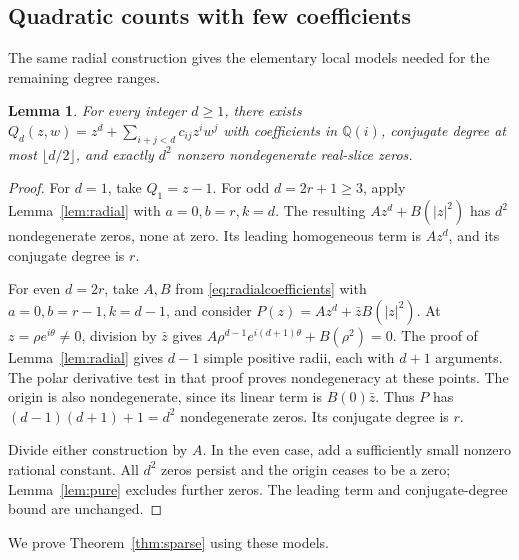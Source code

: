 \documentclass[a4paper]{amsart}
\newtheorem{lem}[thm]{Lemma}
\theoremstyle{remark}
\newcommand{\Q}{\mathbb Q}
\begin{document}
\subsection{Quadratic counts with few coefficients}
The same radial construction gives the elementary local
models needed for the remaining degree ranges.

\begin{lem}\label{lem:models}
For every integer \(d\ge1\), there exists
\(Q_d(z,w)=z^d+\sum_{i+j<d}c_{ij}z^iw^j\)
with coefficients in \(\Q(i)\), conjugate degree at most
\(\lfloor d/2\rfloor\), and exactly \(d^2\) nonzero
nondegenerate real-slice zeros.
\end{lem}

\begin{proof}
For \(d=1\), take \(Q_1=z-1\).
For odd \(d=2r+1\ge3\), apply
Lemma~\ref{lem:radial} with \(a=0,b=r,k=d\).
The resulting \(Az^d+B(|z|^2)\) has \(d^2\)
nondegenerate zeros, none at zero.
Its leading homogeneous term is \(Az^d\),
and its conjugate degree is \(r\).

For even \(d=2r\), take \(A,B\) from
\eqref{eq:radialcoefficients} with
\(a=0,b=r-1,k=d-1\), and consider
\(P(z)=Az^d+\bar zB(|z|^2)\).
At \(z=\rho e^{i\theta}\ne0\), division by \(\bar z\)
gives \(A\rho^{d-1}e^{i(d+1)\theta}+B(\rho^2)=0\).
The proof of Lemma~\ref{lem:radial} gives \(d-1\)
simple positive radii, each with \(d+1\) arguments.
The polar derivative test in that proof proves
nondegeneracy at these points.
The origin is also nondegenerate, since its linear
term is \(B(0)\bar z\). Thus \(P\) has
\((d-1)(d+1)+1=d^2\) nondegenerate zeros.
Its conjugate degree is \(r\).

Divide either construction by \(A\).
In the even case, add a sufficiently small nonzero
rational constant. All \(d^2\) zeros persist and the
origin ceases to be a zero; Lemma~\ref{lem:pure}
excludes further zeros. The leading term
and conjugate-degree bound are unchanged.
\end{proof}

We prove Theorem~\ref{thm:sparse} using these models.
\end{document}
